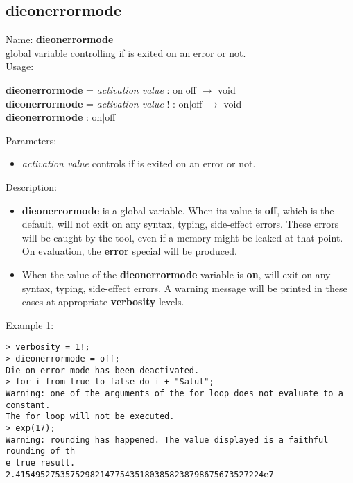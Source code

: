 \subsection{dieonerrormode}
\label{labdieonerrormode}
\noindent Name: \textbf{dieonerrormode}\\
global variable controlling if \sollya is exited on an error or not.\\
\noindent Usage: 
\begin{center}
\textbf{dieonerrormode} = \emph{activation value} : \textsf{on$|$off} $\rightarrow$ \textsf{void}\\
\textbf{dieonerrormode} = \emph{activation value} ! : \textsf{on$|$off} $\rightarrow$ \textsf{void}\\
\textbf{dieonerrormode} : \textsf{on$|$off}\\
\end{center}
Parameters: 
\begin{itemize}
\item \emph{activation value} controls if \sollya is exited on an error or not.
\end{itemize}
\noindent Description: \begin{itemize}

\item \textbf{dieonerrormode} is a global variable. When its value is \textbf{off}, which is the default,
   \sollya will not exit on any syntax, typing, side-effect errors. These
   errors will be caught by the tool, even if a memory might be leaked at 
   that point. On evaluation, the \textbf{error} special will be produced.

\item When the value of the \textbf{dieonerrormode} variable is \textbf{on}, \sollya will exit
   on any syntax, typing, side-effect errors. A warning message will
   be printed in these cases at appropriate \textbf{verbosity} levels. 
\end{itemize}
\noindent Example 1: 
\begin{center}\begin{minipage}{15cm}\begin{Verbatim}[frame=single]
> verbosity = 1!;
> dieonerrormode = off;
Die-on-error mode has been deactivated.
> for i from true to false do i + "Salut";
Warning: one of the arguments of the for loop does not evaluate to a constant.
The for loop will not be executed.
> exp(17);
Warning: rounding has happened. The value displayed is a faithful rounding of th
e true result.
2.41549527535752982147754351803858238798675673527224e7
\end{Verbatim}
\end{minipage}\end{center}
